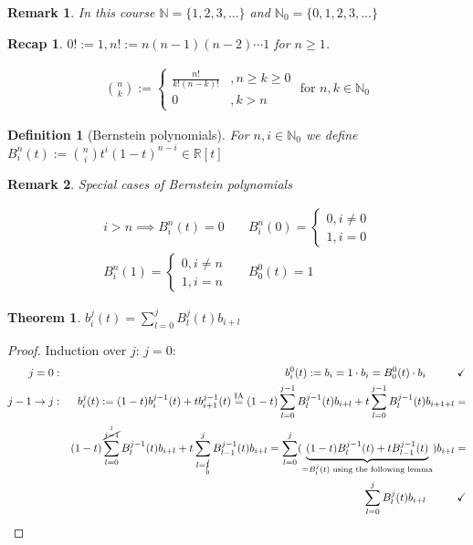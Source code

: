 \documentclass[]{article}
\newtheorem{theorem}{Theorem}
\newtheorem{definition}{Definition}
\newtheorem{remark}{Remark}
\newtheorem{recap}{Recap}
\begin{document}
\begin{remark}
	In this course $\mathbb{N}=\{1,2,3,...\}$ and $\mathbb{N}_0=\{0,1,2,3,...\}$
\end{remark}

\begin{recap}
	$0! := 1, n! := n(n-1)(n-2) \cdots 1$ for $n \geq 1$.
	
	\begin{align*}
		\binom{n}{k} := \begin{cases}
			\frac{n!}{k!(n-k)!}&, n\geq k \geq 0\\
			0&, k > n
		\end{cases} \text{ for } n,k \in \mathbb{N}_0
	\end{align*}
\end{recap}

\begin{definition}[Bernstein polynomials]
	For $n,i \in \mathbb{N}_0$ we define $B_i^n(t) := \binom{n}{i} t^i (1-t)^{n-i} \in \mathbb{R}[t]$
\end{definition}

\begin{remark}
	Special cases of Bernstein polynomials
	
	\begin{align*}
		i > n \implies B_i^n(t) = 0 && B_i^n(0) = \begin{cases}0, i\not= 0\\ 1, i=0 \end{cases} \\
		B_i^n(1) = \begin{cases}0, i\not= n\\ 1, i=n \end{cases} && B_0^0(t) = 1
	\end{align*}
\end{remark}

\begin{theorem}
	$b_i^j(t) = \sum_{l=0}^{j} B_l^j(t) b_{i+l}$
\end{theorem}

\begin{proof}
	Induction over $j$: $j=0$:
	\begin{align*}
		j=0: && b_i^0(t):= b_i = 1 \cdot b_i = B_0^0(t) \cdot b_i \hspace{1cm} \checkmark\\
		j-1 \rightarrow j: && b_i^j(t) := (1-t)b_i^{j-1}(t) + t b_{i+1}^{j-1}(t) \overset{\mathrm{IA}}{=}
		(1-t) \sum_{l=0}^{j-1} B_l^{j-1}(t) b_{i+l} + t \sum_{l=0}^{j-1} B_l^{j-1}(t) b_{i+1+l} =\\
		&& (1-t) \sum_{l=0}^{\overset{j}{\cancel{j-1}}} B_l^{j-1}(t) b_{i+l} + t \sum_{l=\underset{0}{\cancel{1}}}^{j} B_{l-1}^{j-1}(t) b_{i+l} =
		\sum_{l=0}^{j} (\underbrace{(1-t) B_l^{j-1}(t) + t B_{l-1}^{j-1}(t)}_{=B_l^j(t) \text{ using the following lemma}}) b_{i+l} =\\
		&& \sum_{l=0}^{j} B_l^j(t) b_{i+l} \hspace{1cm} \checkmark
	\end{align*}
\end{proof}
\end{document}
